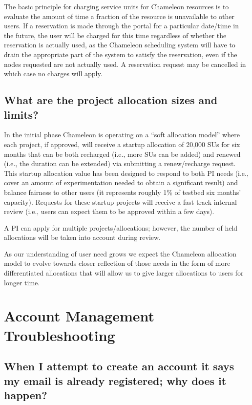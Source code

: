 The basic principle for charging service units for Chameleon resources
is to evaluate the amount of time a fraction of the resource is
unavailable to other users. If a reservation is made through the portal
for a particular date/time in the future, the user will be charged for
this time regardless of whether the reservation is actually used, as the
Chameleon scheduling system will have to drain the appropriate part of
the system to satisfy the reservation, even if the nodes requested are
not actually used. A reservation request may be cancelled in which case
no charges will apply.

\subsection{What are the project allocation sizes and
limits?}\label{what-are-the-project-allocation-sizes-and-limits}

In the initial phase Chameleon is operating on a ``soft allocation
model'' where each project, if approved, will receive a startup
allocation of 20,000 SUs for six months that can be both recharged
(i.e., more SUs can be added) and renewed (i.e., the duration can be
extended) via submitting a renew/recharge request. This startup
allocation value has been designed to respond to both PI needs (i.e.,
cover an amount of experimentation needed to obtain a significant
result) and balance fairness to other users (it represents roughly 1\%
of testbed six months' capacity). Requests for these startup projects
will receive a fast track internal review (i.e., users can expect them
to be approved within a few days).

A PI can apply for multiple projects/allocations; however, the number of
held allocations will be taken into account during review.

As our understanding of user need grows we expect the Chameleon
allocation model to evolve towards closer reflection of those needs in
the form of more differentiated allocations that will allow us to give
larger allocations to users for longer time.

\section{Account Management
Troubleshooting}\label{account-management-troubleshooting}

\subsection{When I attempt to create an account it says my email is
already registered; why does it
happen?}\label{when-i-attempt-to-create-an-account-it-says-my-email-is-already-registered-why-does-it-happen}

